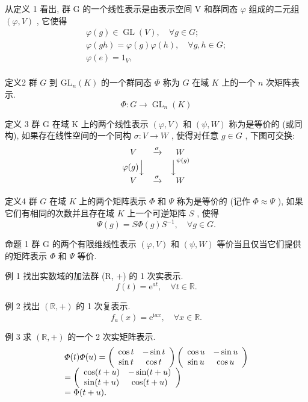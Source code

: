 \documentclass[]{article}
\begin{document}
从定义 1 看出, 群 G 的一个线性表示是由表示空间 V 和群同态 $\varphi$ 组成的二元组 $(\varphi, V)$ , 它使得 $$
\begin{array}{l} \varphi (g) \in \operatorname{GL} (V), \quad \forall g \in G; \\ \varphi (g h) = \varphi (g) \varphi (h), \quad \forall g, h \in G; \\ \varphi (e) = 1 _ {V}, \\ \end{array}
$$

定义2 群 $G$ 到 $\mathrm{GL}_n(K)$ 的一个群同态 $\Phi$ 称为 $G$ 在域 $K$ 上的一个 $n$ 次矩阵表示. $$
\varPhi : G \to \operatorname{GL} _ {n} (K)
$$

定义 3 群 G 在域 K 上的两个线性表示 $(\varphi, V)$ 和 $(\psi, W)$ 称为是等价的 (或同构), 如果存在线性空间的一个同构 $\sigma: V \to W$ , 使得对任意 $g \in G$ , 下图可交换: $$
\begin{array}{c c c} V & \xrightarrow {\sigma} & W \\ \varphi (g) \Big \downarrow & & \Big \downarrow^ {\psi (g)} \\ V & \xrightarrow {\sigma} & W \end{array}
$$

定义4 群 $G$ 在域 $K$ 上的两个矩阵表示 $\varPhi$ 和 $\varPsi$ 称为是等价的 (记作 $\varPhi \approx \varPsi$ ), 如果它们有相同的次数并且存在域 $K$ 上一个可逆矩阵 $S$ , 使得 $$
\Psi (g) = S \Phi (g) S ^ {- 1}, \quad \forall g \in G. 
$$

命题 1 群 G 的两个有限维线性表示 $(\varphi, V)$ 和 $(\psi, W)$ 等价当且仅当它们提供的矩阵表示 $\Phi$ 和 $\Psi$ 等价. 

例 1 找出实数域的加法群 (R, +) 的 1 次实表示. $$
f (t) = \mathrm{e} ^ {a t}, \quad \forall t \in \mathbb {R}.
$$

例 2 找出 $(\mathbb{R}, +)$ 的 1 次复表示. $$
f _ {a} (x) = \mathrm{e} ^ {\mathrm{i} a x}, \quad \forall x \in \mathbb {R}.
$$

例 3 求 $(\mathbb{R}, +)$ 的一个 2 次实矩阵表示.$$
\begin{array}{l} \varPhi (t) \varPhi (u) = \left( \begin{array}{c c} \cos t & - \sin t \\ \sin t & \cos t \end{array} \right) \left( \begin{array}{c c} \cos u & - \sin u \\ \sin u & \cos u \end{array} \right) \\ = \left( \begin{array}{c c} \cos (t + u) & - \sin (t + u) \\ \sin (t + u) & \cos (t + u) \end{array} \right) \\ = \Phi (t + u). \\ \end{array}
$$
\end{document}
